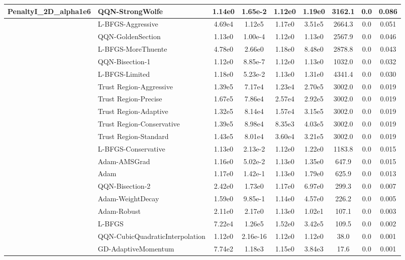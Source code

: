 \documentclass[10pt]{article}
\begin{document}
\begin{longtable}{|l|l|c|c|c|c|c|c|c|}
PenaltyI\_2D\_alpha1e6 & \textbf{QQN-StrongWolfe} & 1.14e0 & 1.65e-2 & 1.12e0 & 1.19e0 & 3162.1 & 0.0 & 0.086 \\
\hline
 & L-BFGS-Aggressive & 4.69e4 & 1.12e5 & 1.17e0 & 3.51e5 & 2664.3 & 0.0 & 0.051 \\
\hline
 & QQN-GoldenSection & 1.13e0 & 1.00e-4 & 1.12e0 & 1.13e0 & 2567.9 & 0.0 & 0.046 \\
\hline
 & L-BFGS-MoreThuente & 4.78e0 & 2.66e0 & 1.18e0 & 8.48e0 & 2878.8 & 0.0 & 0.043 \\
\hline
 & QQN-Bisection-1 & 1.12e0 & 8.85e-7 & 1.12e0 & 1.13e0 & 1032.0 & 0.0 & 0.032 \\
\hline
 & L-BFGS-Limited & 1.18e0 & 5.23e-2 & 1.13e0 & 1.31e0 & 4341.4 & 0.0 & 0.030 \\
\hline
 & Trust Region-Aggressive & 1.39e5 & 7.17e4 & 1.23e4 & 2.70e5 & 3002.0 & 0.0 & 0.019 \\
\hline
 & Trust Region-Precise & 1.67e5 & 7.86e4 & 2.57e4 & 2.92e5 & 3002.0 & 0.0 & 0.019 \\
\hline
 & Trust Region-Adaptive & 1.32e5 & 8.14e4 & 1.57e4 & 3.15e5 & 3002.0 & 0.0 & 0.019 \\
\hline
 & Trust Region-Conservative & 1.39e5 & 8.98e4 & 8.35e3 & 4.03e5 & 3002.0 & 0.0 & 0.019 \\
\hline
 & Trust Region-Standard & 1.43e5 & 8.01e4 & 3.60e4 & 3.21e5 & 3002.0 & 0.0 & 0.019 \\
\hline
 & L-BFGS-Conservative & 1.13e0 & 2.13e-2 & 1.12e0 & 1.22e0 & 1183.8 & 0.0 & 0.015 \\
\hline
 & Adam-AMSGrad & 1.16e0 & 5.02e-2 & 1.13e0 & 1.35e0 & 647.9 & 0.0 & 0.015 \\
\hline
 & Adam & 1.17e0 & 1.42e-1 & 1.13e0 & 1.79e0 & 625.9 & 0.0 & 0.013 \\
\hline
 & QQN-Bisection-2 & 2.42e0 & 1.73e0 & 1.17e0 & 6.97e0 & 299.3 & 0.0 & 0.007 \\
\hline
 & Adam-WeightDecay & 1.59e0 & 9.85e-1 & 1.14e0 & 4.57e0 & 226.2 & 0.0 & 0.005 \\
\hline
 & Adam-Robust & 2.11e0 & 2.17e0 & 1.13e0 & 1.02e1 & 107.1 & 0.0 & 0.003 \\
\hline
 & L-BFGS & 7.22e4 & 1.26e5 & 1.52e0 & 3.42e5 & 109.5 & 0.0 & 0.002 \\
\hline
 & QQN-CubicQuadraticInterpolation & 1.12e0 & 2.16e-16 & 1.12e0 & 1.12e0 & 38.0 & 0.0 & 0.001 \\
\hline
 & GD-AdaptiveMomentum & 7.74e2 & 1.18e3 & 1.15e0 & 3.84e3 & 17.6 & 0.0 & 0.001 \\

\end{longtable}
\end{document}

